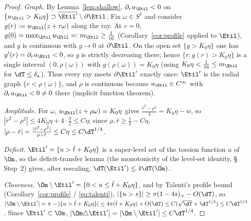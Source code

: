 \begin{proof}
\emph{Graph.} By Lemma~\ref{lem:shallow}, $\partial_r u_{\Etil}<0$ on
$\{u_{\Etil}>K_0\eta\}\supset\overline{\Etil'}\setminus\partial\Etil$. Fix
$\omega\in S^1$ and consider $g(r):=u_{\Etil}(z+r\omega)$ along the ray.
At $r=0$, $g(0)=\max_{\Etil}u_{\Etil}=:m_{\Etil}\ge\tfrac1{16}$
(Corollary~\ref{cor:profile} applied to $\Etil$), and $g$ is continuous with
$g\to0$ at $\partial\Etil$. On the open set $\{g>K_0\eta\}$ one has
$g'(r)=\partial_r u_{\Etil}<0$, so $g$ is strictly decreasing there; hence
$\{r:g(r)>K_0\eta\}$ is a single interval $(0,\rho(\omega))$ with
$g(\rho(\omega))=K_0\eta$ (using $K_0\eta<\tfrac1{16}\le m_{\Etil}$ for
$\dT\le\delta_\star$). Thus every ray meets $\partial\Etil'$ exactly once:
$\Etil'$ is the radial graph $\{r<\rho(\omega)\}$, and $\rho$ is continuous
because $u_{\Etil}\in C^\infty$ with $\partial_r u_{\Etil}<0\ne0$ there
(implicit function theorem).

\emph{Amplitude.} For $\omega$, $u_{\Etil}(z+\rho\omega)=K_0\eta$ gives
$\frac{\hat r^2-\rho^2}{4}=K_0\eta-w$, so $|\hat r^2-\rho^2|\le4K_0\eta
+4\cdot\frac{\eta}{2}\le C\eta$; since $\rho,\hat r\ge\tfrac12-C\eta$,
$|\rho-\hat r|=\frac{|\hat r^2-\rho^2|}{\rho+\hat r}\le C\eta\le C\dT^{1/4}$.

\emph{Deficit.} $\Etil'=\{u>\hat t+K_0\eta\}$ is a super-level set of the
torsion function $u$ of $\Om$, so the deficit-transfer lemma (the
monotonicity of the level-set identity, \S\,Step~2) gives, after rescaling,
$\dT(\Etil')\le 4\dT(\Om)$.

\emph{Closeness.} $\Om\setminus\Etil'=\{0<u\le\hat t+K_0\eta\}$, and by
Talenti's profile bound (Corollary~\ref{cor:profile} / \eqref{eq:talenti}),
$|\{u>s\}|\ge\pi(1-4s)_+-O(\dT)$, so
$|\Om\setminus\Etil'|=\pi-|\{u>\hat t+K_0\eta\}|\le 4\pi(\hat t+K_0\eta)
+O(\dT)\le C(\sqrt\dT+\dT^{1/4})\le C\dT^{1/4}$. Since $\Etil'\subset\Om$,
$|\Om\triangle\Etil'|=|\Om\setminus\Etil'|\le C\dT^{1/4}$.
\end{proof}


